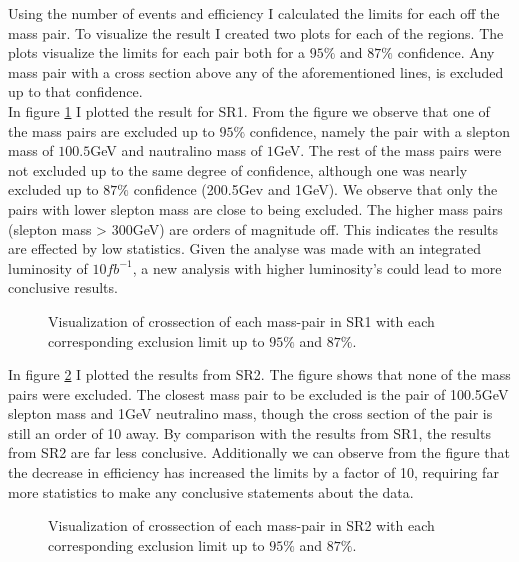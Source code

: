 \documentclass{article}
\begin{document}
\egroup
Using the number of events and efficiency I calculated the limits for each off the mass pair. To visualize the result I created two plots for each of the regions. The plots visualize the limits for each pair both for a $95\%$ and $87\%$ confidence. Any mass pair with a cross section above any of the aforementioned lines, is excluded up to that confidence. 
\\
In figure \ref{fig:ExlusionSR1} I plotted the result for SR1. From the figure we observe that one of the mass pairs are excluded up to $95\%$ confidence, namely the pair with a slepton mass of $100.5$GeV and nautralino mass of $1$GeV. The rest of the mass pairs were not excluded up to the same degree of confidence, although one was nearly excluded up to $87\%$ confidence (200.5Gev and 1GeV). We observe that only the pairs with lower slepton mass are close to being excluded. The higher mass pairs (slepton mass > 300GeV) are orders of magnitude off. This indicates the results are effected by low statistics. Given the analyse was made with an integrated luminosity of $10fb^{-1}$, a new analysis with higher luminosity's could lead to more conclusive results.
\\
\begin{figure}
     \caption{Visualization of crossection of each mass-pair in SR1 with each corresponding exclusion limit up to $95\%$ and $87\%$.}
     \label{fig:ExlusionSR1}
\end{figure}
In figure \ref{fig:ExlusionSR2} I plotted the results from SR2. The figure shows that none of the mass pairs were excluded. The closest mass pair to be excluded is the pair of 100.5GeV slepton mass and 1GeV neutralino mass, though the cross section of the pair is still an order of 10 away. By comparison with the results from SR1, the results from SR2 are far less conclusive. Additionally we can observe from the figure that the decrease in efficiency has increased the limits by a factor of 10, requiring far more statistics to make any conclusive statements about the data. \\
\begin{figure}
     \caption{Visualization of crossection of each mass-pair in SR2 with each corresponding exclusion limit up to $95\%$ and $87\%$.}
     \label{fig:ExlusionSR2}
\end{figure}
\end{document}
